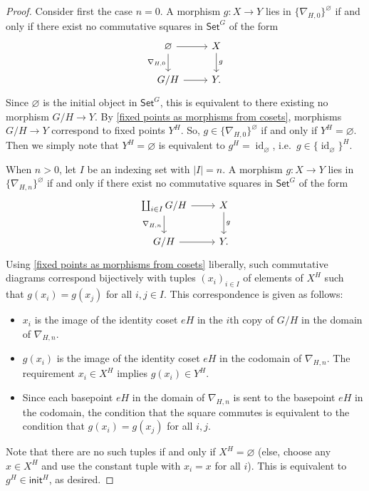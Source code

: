 \documentclass{amsart}
\renewcommand\emptyset\varnothing
\newcommand{\Set}{\mathsf{Set}}
\newcommand{\GSet}{\Set^G}
\newcommand{\init}{\mathsf{init}}
\DeclareMathOperator{\id}{id}
\numberwithin{equation}{section}
\theoremstyle{definition}
\begin{document}
\begin{proof}
	Consider first the case $n = 0$. A morphism $g \colon X \to Y$ lies in $\{\nabla_{H,0}\}^\emptyset$ if and only if there exist no commutative squares in $\GSet$ of the form 
	\[
		\begin{tikzcd}
			\emptyset \ar[r] \ar[d, "\nabla_{H,0}"'] & X \ar[d, "g"] \\
			G/H \ar[r] & Y.
		\end{tikzcd}
	\]
	Since $\emptyset$ is the initial object in $\GSet$, this is equivalent to there existing no morphism $G/H \to Y$. By \cref{fixed points as morphisms from cosets}, morphisms $G/H \to Y$ correspond to fixed points $Y^H$. So, $g \in \{\nabla_{\!H,0}\}^\emptyset$ if and only if $Y^H = \emptyset$. Then we simply note that $Y^H = \emptyset$ is equivalent to $g^H = \id_\emptyset$, i.e.\ $g \in \{\id_\emptyset\}^H$.

	When $n > 0$, let $I$ be an indexing set with $\lvert I \rvert = n$. A morphism $g \colon X \to Y$ lies in $\{\nabla_{H,n}\}^\emptyset$ if and only if there exist no commutative squares in $\GSet$ of the form 
	\[
		\begin{tikzcd}
			\coprod_{i \in I} G/H \ar[r] \ar[d, "\nabla_{H,n}"'] & X \ar[d, "g"] \\
			G/H \ar[r] & Y.
		\end{tikzcd}
	\]
	Using \cref{fixed points as morphisms from cosets} liberally, such commutative diagrams correspond bijectively with tuples $(x_i)_{i \in I}$ of elements of $X^H$ such that $g(x_i) = g(x_j)$ for all $i,j \in I$. This correspondence is given as follows:
	\begin{itemize}
		\item $x_i$ is the image of the identity coset $eH$ in the $i$th copy of $G/H$ in the domain of $\nabla_{H,n}$.
		\item $g(x_i)$ is the image of the identity coset $eH$ in the codomain of $\nabla_{H,n}$. The requirement $x_i \in X^H$ implies $g(x_i) \in Y^H$.
		\item Since each basepoint $eH$ in the domain of $\nabla_{H,n}$ is sent to the basepoint $eH$ in the codomain, the condition that the square commutes is equivalent to the condition that $g(x_i) = g(x_j)$ for all $i,j$.
		\end{itemize}
	Note that there are no such tuples if and only if $X^H = \emptyset$ (else, choose any $x \in X^H$ and use the constant tuple with $x_i = x$ for all $i$). This is equivalent to $g^H \in \init^H$, as desired.
\end{proof}
\end{document}
